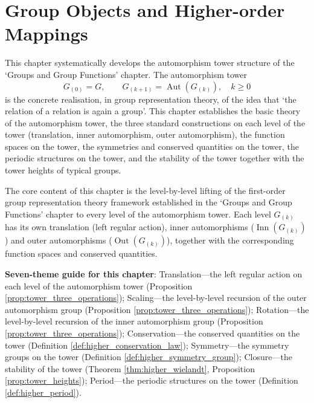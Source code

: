 \chapter{Group Objects and Higher-order Mappings}
\label{chap:higher_group}

\begin{remark}\label{rem:higher_group_chapter_positioning}
This chapter systematically develops the automorphism tower structure of the `Groups and Group Functions' chapter. The automorphism tower
\[
G_{(0)} = G,\qquad G_{(k+1)} = \operatorname{Aut}(G_{(k)}),\quad k\ge 0
\]
is the concrete realisation, in group representation theory, of the idea that `the relation of a relation is again a group'. This chapter establishes the basic theory of the automorphism tower, the three standard constructions on each level of the tower (translation, inner automorphism, outer automorphism), the function spaces on the tower, the symmetries and conserved quantities on the tower, the periodic structures on the tower, and the stability of the tower together with the tower heights of typical groups.

The core content of this chapter is the level-by-level lifting of the first-order group representation theory framework established in the `Groups and Group Functions' chapter to every level of the automorphism tower. Each level $G_{(k)}$ has its own translation (left regular action), inner automorphisms ($\operatorname{Inn}(G_{(k)})$) and outer automorphisms ($\operatorname{Out}(G_{(k)})$), together with the corresponding function spaces and conserved quantities.

\textbf{Seven-theme guide for this chapter}: Translation---the left regular action on each level of the automorphism tower (Proposition \ref{prop:tower_three_operations}); Scaling---the level-by-level recursion of the outer automorphism group (Proposition \ref{prop:tower_three_operations}); Rotation---the level-by-level recursion of the inner automorphism group (Proposition \ref{prop:tower_three_operations}); Conservation---the conserved quantities on the tower (Definition \ref{def:higher_conservation_law}); Symmetry---the symmetry groups on the tower (Definition \ref{def:higher_symmetry_group}); Closure---the stability of the tower (Theorem \ref{thm:higher_wielandt}, Proposition \ref{prop:tower_heights}); Period---the periodic structures on the tower (Definition \ref{def:higher_period}).
\end{remark}

